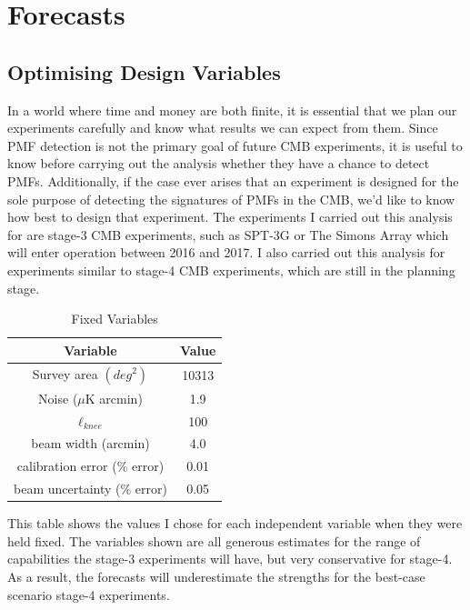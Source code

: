 \section{Forecasts}

\subsection{Optimising Design Variables}

In a world where time and money are both finite, it is essential that we plan our experiments carefully and know what results we can expect from them. Since PMF detection is not the primary goal of future CMB experiments, it is useful to know before carrying out the analysis whether they have a chance to detect PMFs. Additionally, if the case ever arises that an experiment is designed for the sole purpose of detecting the signatures of PMFs in the CMB, we'd like to know how best to design that experiment. The experiments I carried out this analysis for are stage-3 CMB experiments, such as SPT-3G or The Simons Array which will enter operation between 2016 and 2017. I also carried out this analysis for experiments similar to stage-4 CMB experiments, which are still in the planning stage.

\begin{table}[h]
\centering
\caption{Fixed Variables}
\label{table: fixed-stats}
\begin{tabular}{l|l}
\multicolumn{1}{c}{Variable} & \multicolumn{1}{|c}{Value} \\ \hline
\multicolumn{1}{c}{Survey area $(deg^2)$} & \multicolumn{1}{|c}{10313}  \\
\multicolumn{1}{c}{Noise ($\mu$K arcmin)} & \multicolumn{1}{|c}{1.9}   \\
\multicolumn{1}{c}{$\ell_{knee}$} & \multicolumn{1}{|c}{100} \\
\multicolumn{1}{c}{beam width (arcmin)} & \multicolumn{1}{|c}{4.0}   \\
\multicolumn{1}{c}{calibration error (\% error)} & \multicolumn{1}{|c}{0.01} \\
\multicolumn{1}{c}{beam uncertainty (\% error)} & \multicolumn{1}{|c}{0.05}
\end{tabular}
\begin{flushleft}
This table shows the values I chose for each independent variable when they were held fixed. The variables shown are all generous estimates for the range of capabilities the stage-3 experiments will have, but very conservative for stage-4. As a result, the forecasts will underestimate the strengths for the best-case scenario stage-4 experiments.
\end{flushleft}
\end{table}

